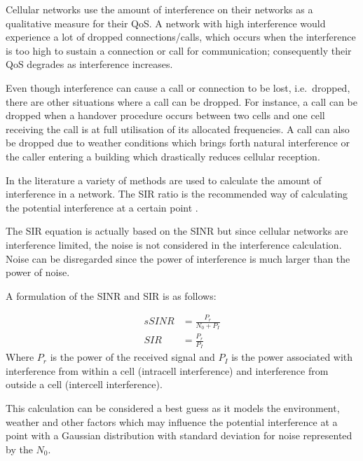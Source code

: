 Cellular networks use the amount of interference on their networks as a qualitative measure for their \gls{QoS}\cite{WirelessCommunications}. A network with high interference would experience a lot of dropped connections/calls, which occurs when the interference is too high to sustain a connection or call for communication; consequently their \gls{QoS} degrades as interference increases\cite{WirelessCommunications,WirelessDigitalCommunications}.

Even though interference can cause a call or connection to be lost, i.e.\ dropped, there are other situations where a call can be dropped\cite{GSMSysEngin}. For instance, a call can be dropped when a handover procedure occurs between two cells and one cell receiving the call is at full utilisation of its allocated frequencies\cite{GSMSysEngin,WirelessDigitalCommunications}. A call can also be dropped due to weather conditions which brings forth natural interference or the caller entering a building which drastically reduces cellular reception\cite{WirelessDigitalCommunications}.

In the literature a variety of methods are used to calculate the amount of interference in a network. The \gls{SIR} ratio is the recommended way of calculating the potential interference at a certain point \cite{Karen2004}. 

The \gls{SIR} equation is actually based on the \gls{SINR} but since cellular networks are interference limited, the noise is not considered in the interference calculation\cite{WirelessCommunications}. Noise can be disregarded since the power of interference is much larger than the power of noise\cite{WirelessDigitalCommunications}.

A formulation of the \gls{SINR} and \gls{SIR} is as follows:

\begin{align}s 
	SINR &= \frac{P_r}{N_0 + P_I}\\
	SIR &= \frac{P_r}{P_I}
\end{align}
Where $P_r$ is the power of the received signal and $P_I$ is the power associated with interference from within a cell (intracell interference) and interference from outside a cell (intercell interference)\cite{WirelessCommunications}.

This calculation can be considered a best guess as it models the environment, weather and other factors which may influence the potential interference at a point with a Gaussian distribution with standard deviation for noise represented by the $N_0$\cite{Karen2004}. 

